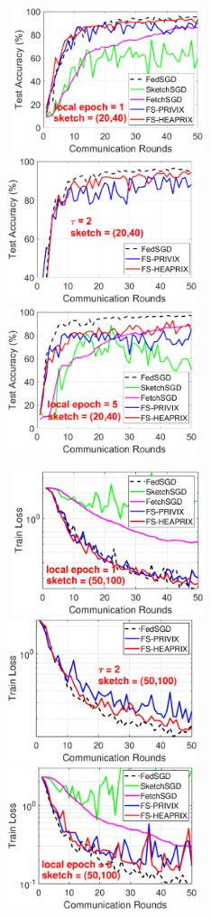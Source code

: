 \documentclass[11pt]{article}
\begin{document}
\begin{figure}[h]
\begin{center}
		\mbox{%
		\includegraphics[width=2.2in]{MNIST_figures/local1_sketch20_iid0_test_acc.eps} %
		\includegraphics[width=2.2in]{MNIST_figures/local2_sketch20_iid0_test_acc.eps} %
		\includegraphics[width=2.2in]{MNIST_figures/local5_sketch20_iid0_test_acc.eps}
		}
		
		\mbox{%
		\includegraphics[width=2.2in]{MNIST_figures/local1_sketch50_iid0_train_loss.eps}%
		\includegraphics[width=2.2in]{MNIST_figures/local2_sketch50_iid0_train_loss.eps}%
		\includegraphics[width=2.2in]{MNIST_figures/local5_sketch50_iid0_train_loss.eps}}
		

\end{center}
\end{figure}
\end{document}
